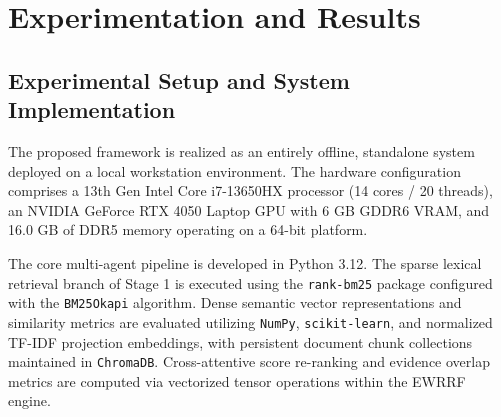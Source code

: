 \documentclass[conference]{IEEEtran}
\begin{document}
\section{Experimentation and Results}

\subsection{Experimental Setup and System Implementation}
The proposed framework is realized as an entirely offline, standalone system deployed on a local workstation environment. The hardware configuration comprises a 13th Gen Intel Core i7-13650HX processor (14 cores / 20 threads), an NVIDIA GeForce RTX 4050 Laptop GPU with 6 GB GDDR6 VRAM, and 16.0 GB of DDR5 memory operating on a 64-bit platform.

The core multi-agent pipeline is developed in Python 3.12. The sparse lexical retrieval branch of Stage 1 is executed using the \texttt{rank-bm25} package configured with the \texttt{BM25Okapi} algorithm. Dense semantic vector representations and similarity metrics are evaluated utilizing \texttt{NumPy}, \texttt{scikit-learn}, and normalized TF-IDF projection embeddings, with persistent document chunk collections maintained in \texttt{ChromaDB}. Cross-attentive score re-ranking and evidence overlap metrics are computed via vectorized tensor operations within the EWRRF engine.
\end{document}
